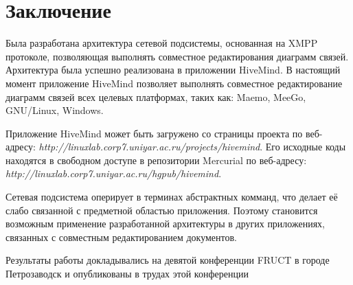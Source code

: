 \newpage

\chapter*{Заключение}


Была разработана архитектура сетевой подсистемы, основанная на
XMPP протоколе, позволяющая выполнять совместное редактирования диаграмм связей.
Архитектура была успешно реализована в приложении HiveMind. В настоящий момент
приложение HiveMind позволяет выполнять совместное редактирование диаграмм
связей всех целевых платформах, таких как: Maemo, MeeGo, GNU/Linux, Windows.

Приложение HiveMind может быть загружено со страницы проекта по веб-адресу:
\emph{http://linuxlab.corp7.uniyar.ac.ru/projects/hivemind}. Его исходные коды
находятся в свободном доступе в репозитории Mercurial по веб-адресу:
\emph{http://linuxlab.corp7.uniyar.ac.ru/hgpub/hivemind}.

Сетевая подсистема оперирует в терминах абстрактных комманд, что делает её
слабо связанной с предметной областью приложения. Поэтому становится возможным
применение разработанной архитектуры в других приложениях, связанных с
совместным редактированием документов.

Результаты работы докладывались на девятой конференции FRUCT в городе
Петрозаводск и опубликованы в трудах этой конференции \cite{hivemind-9th-fruct}
